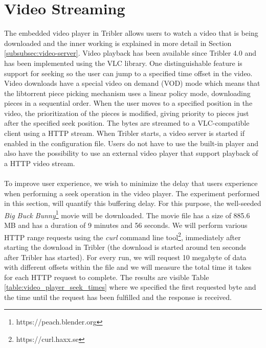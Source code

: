 \section{Video Streaming}
The embedded video player in Tribler allows users to watch a video that is being downloaded and the inner working is explained in more detail in Section \ref{subsubsec:video-server}. Video playback has been available since Tribler 4.0 and has been implemented using the VLC library. One distinguishable feature is support for seeking so the user can jump to a specified time offset in the video. Video downloads have a special video on demand (VOD) mode which means that the libtorrent piece picking mechanism uses a linear policy mode, downloading pieces in a sequential order. When the user moves to a specified position in the video, the prioritization of the pieces is modified, giving priority to pieces just after the specified seek position. The bytes are streamed to a VLC-compatible client using a HTTP stream. When Tribler starts, a video server is started if enabled in the configuration file. Users do not have to use the built-in player and also have the possibility to use an external video player that support playback of a HTTP video stream.\\\\
To improve user experience, we wish to minimize the delay that users experience when performing a seek operation in the video player. The experiment performed in this section, will quantify this buffering delay. For this purpose, the well-seeded \emph{Big Buck Bunny}\footnote{https://peach.blender.org} movie will be downloaded. The movie file has a size of 885.6 MB and has a duration of 9 minutes and 56 seconds. We will perform various HTTP range requests using the \emph{curl} command line tool\footnote{https://curl.haxx.se}, immediately after starting the download in Tribler (the download is started around ten seconds after Tribler has started). For every run, we will request 10 megabyte of data with different offsets within the file and we will measure the total time it takes for each HTTP request to complete. The results are visible Table \ref{table:video_player_seek_times} where we specified the first requested byte and the time until the request has been fulfilled and the response is received.\\

